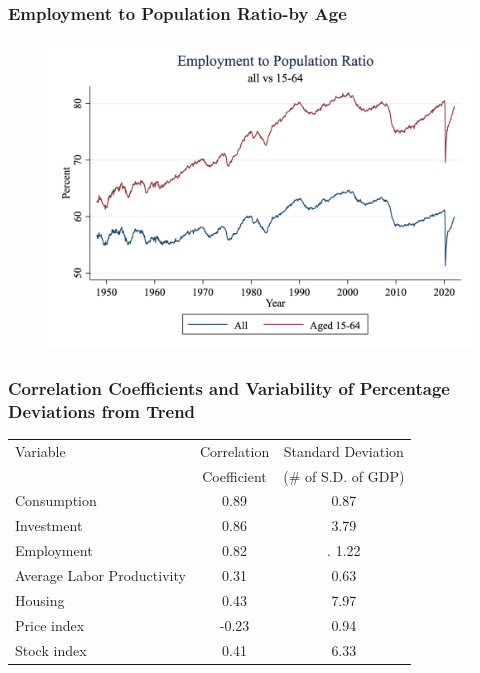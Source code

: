 \documentclass{beamer}
\begin{document}
\begin{frame}
\frametitle[alignment=center]{Employment to Population Ratio-by Age}
\begin{figure}
\centering
\includegraphics[scale=0.25]{Figures/EmPop3.png}
\end{figure}
\end{frame}

\begin{frame}
\frametitle[alignment=center]{Correlation Coefficients and Variability of Percentage Deviations from Trend}
\begin{table}
\centering
\begin{tabular}{lcc}
\hline\hline
Variable & Correlation & Standard Deviation \\
 & Coefficient & (\# of S.D. of GDP) \\
 \hline
Consumption & 0.89 & 0.87 \\
Investment  & 0.86 & 3.79 \\
Employment & 0.82  &. 1.22 \\ 
Average Labor Productivity & 0.31 & 0.63 \\
Housing & 0.43 & 7.97 \\
Price index & -0.23 & 0.94 \\
Stock index & 0.41 & 6.33 \\
\hline\hline
\end{tabular}
\end{table}
\end{frame}
\end{document}
